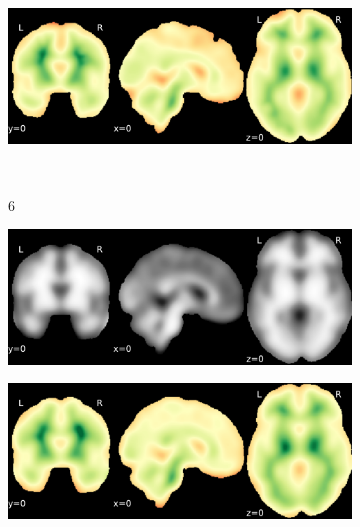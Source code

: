 \documentclass{article}
\begin{document}
\begin{appendices}
\begin{landscape}
\begin{figure}
\begin{subfigure}[t]{0.2\paperheight}
            \end{subfigure}
            \begin{subfigure}[t]{0.2\paperheight}
                \centering
                \includegraphics[width=\textwidth]{figures/sig/15mm/rr.rs_ds001748_sub-adult15_sig.pdf}
            \end{subfigure} \\
            \begin{subfigure}[b][][c]{0.01\paperwidth} 6 \vspace*{15pt} \end{subfigure}
            \begin{subfigure}[t]{0.2\paperheight}
                \centering
                \includegraphics[width=\textwidth]{figures/sig/15mm/ieee_ds001748_sub-adult16.pdf}
            \end{subfigure}
            \begin{subfigure}[t]{0.2\paperheight}
                \centering
                \includegraphics[width=\textwidth]{figures/sig/15mm/rr_ds001748_sub-adult16_sig.pdf}

\end{subfigure}
\end{figure}
\end{landscape}
\end{appendices}
\end{document}
